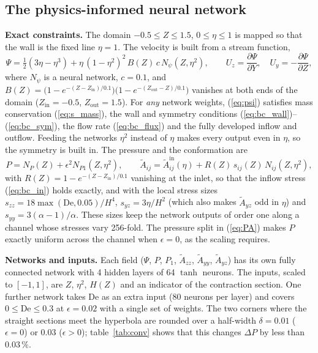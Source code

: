 \documentclass[11pt,a4paper]{article}
\newcommand{\De}{\mathrm{De}}
\begin{document}
\subsection{The physics-informed neural network}
\label{sec:pinn}
\textbf{Exact constraints.} The domain $-0.5\le Z\le1.5$, $0\le\eta\le1$ is mapped so that the wall is the fixed line $\eta=1$. The velocity is built from a stream function,
\begin{equation}
\Psi=\tfrac12(3\eta-\eta^3)+\eta\,(1-\eta^2)^2\,B(Z)\,c\,N_\psi(Z,\eta^2),\qquad U_z=\frac{\partial\Psi}{\partial Y},\quad U_y=-\frac{\partial\Psi}{\partial Z},
\label{eq:psi}
\end{equation}
where $N_\psi$ is a neural network, $c=0.1$, and $B(Z)=\big(1-e^{-(Z-Z_{\mathrm{in}})/0.1}\big)\big(1-e^{-(Z_{\mathrm{out}}-Z)/0.1}\big)$ vanishes at both ends of the domain ($Z_{\mathrm{in}}=-0.5$, $Z_{\mathrm{out}}=1.5$). For \emph{any} network weights, (\ref{eq:psi}) satisfies mass conservation (\ref{eq:s_mass}), the wall and symmetry conditions (\ref{eq:bc_wall})--(\ref{eq:bc_sym}), the flow rate (\ref{eq:bc_flux}) and the fully developed inflow and outflow. Feeding the networks $\eta^2$ instead of $\eta$ makes every output even in $\eta$, so the symmetry is built in. The pressure and the conformation are
\begin{equation}
P=N_P(Z)+\epsilon^2N_{P1}(Z,\eta^2),\qquad
\tilde A_{ij}=\tilde A_{ij}^{\mathrm{in}}(\eta)+R(Z)\,s_{ij}(Z)\,N_{ij}(Z,\eta^2),
\label{eq:PA}
\end{equation}
with $R(Z)=1-e^{-(Z-Z_{\mathrm{in}})/0.1}$ vanishing at the inlet, so that the inflow stress (\ref{eq:bc_in}) holds exactly, and with the local stress sizes $s_{zz}=18\max(\De,0.05)/H^4$, $s_{yz}=3\eta/H^2$ (which also makes $\tilde A_{yz}$ odd in $\eta$) and $s_{yy}=3(\alpha-1)/\alpha$. These sizes keep the network outputs of order one along a channel whose stresses vary 256-fold. The pressure split in (\ref{eq:PA}) makes $P$ exactly uniform across the channel when $\epsilon=0$, as the scaling requires.

\textbf{Networks and inputs.} Each field ($\Psi$, $P$, $P_1$, $\tilde A_{zz}$, $\tilde A_{yy}$, $\tilde A_{yz}$) has its own fully connected network with 4 hidden layers of 64 $\tanh$ neurons. The inputs, scaled to $[-1,1]$, are $Z$, $\eta^2$, $H(Z)$ and an indicator of the contraction section. One further network takes $\De$ as an extra input (80 neurons per layer) and covers $0\le\De\le0.3$ at $\epsilon=0.02$ with a single set of weights. The two corners where the straight sections meet the hyperbola are rounded over a half-width $\delta=0.01$ ($\epsilon=0$) or $0.03$ ($\epsilon>0$); table~\ref{tab:conv} shows that this changes $\Delta P$ by less than $0.03\,\%$.
\end{document}
